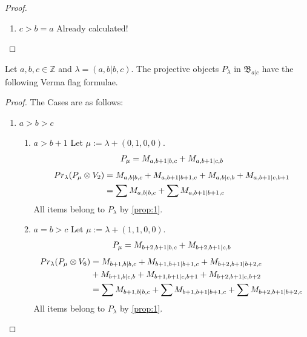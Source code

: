 \begin{proof}
\begin{enumerate}
\begin{enumerate}
  \end{enumerate}

\item $c>b=a$ Already calculated! 

\end{enumerate}
\end{proof}


\begin{theorem}
  Let $a,b,c \in \mathbb{Z}$ and $\lambda = (a,b|b,c)$. The projective objects $P_{\lambda}$ in $\mathfrak{B}_{a|c}$ have the following Verma flag formulae.
\end{theorem}
\begin{proof} The Cases are as follows:\par
\begin{enumerate}
  \item $a>b>c$
  \begin{enumerate}
    \item $a>b+1$
        Let $\mu:=\lambda + (0,1,0,0) $. 
\begin{equation}\notag
  \begin{aligned}
      P_{\mu} =
M_{a,b+1|b,c}
+M_{a,b+1|c,b}
  \end{aligned}
\end{equation}
\begin{equation}\notag
  \begin{aligned}
    Pr_{\lambda}(P_\mu \otimes V_2) &=
M_{a,b|b,c}
+M_{a,b+1|b+1,c}
+M_{a,b|c,b}
+M_{a,b+1|c,b+1}\\
                                    &=
\sum M_{a,b|b,c}
+\sum M_{a,b+1|b+1,c}
  \end{aligned}
\end{equation}
All items belong to $P_\lambda$ by \cref{prop:1}.
    
\item $a=b>c$
        Let $\mu:=\lambda + (1,1,0,0) $. 
\begin{equation}\notag
  \begin{aligned}
      P_{\mu} =
M_{b+2,b+1|b,c}
+M_{b+2,b+1|c,b}
  \end{aligned}
\end{equation}
\begin{equation}\notag
  \begin{aligned}
  Pr_{\lambda}(P_\mu \otimes V_6) &=
M_{b+1,b|b,c}
+M_{b+1,b+1|b+1,c}
+M_{b+2,b+1|b+2,c} \\
                                  &+
M_{b+1,b|c,b}
+M_{b+1,b+1|c,b+1} 
+M_{b+2,b+1|c,b+2} \\
                                    &=
\sum M_{b+1,b|b,c}
+\sum M_{b+1,b+1|b+1,c}
+\sum M_{b+2,b+1|b+2,c}
  \end{aligned}
\end{equation}
All items belong to $P_\lambda$ by \cref{prop:1}.
  \end{enumerate}


\end{enumerate}
\end{proof}
